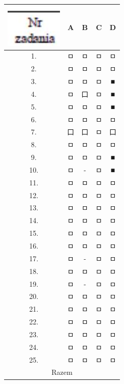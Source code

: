 \documentclass[10pt]{article}
\begin{document}
\begin{center}
\begin{tabular}{|c|c|c|c|c|}
\hline
\includegraphics[max width=\textwidth]{2024_11_21_92d5a9232f32cac9f1a4g-16}
 & A & B & C & D \\
\hline
1. & ㅁ & ㅁ & ㅁ & ㅁ \\
\hline
2. & ㅁ & ㅁ & ㅁ & ㅁ \\
\hline
3. & ㅁ & ㅁ & ㅁ & ■ \\
\hline
4. & ㅁ & 口 & ㅁ & ■ \\
\hline
5. & ㅁ & ㅁ & ㅁ & ■ \\
\hline
6. & ㅁ & ㅁ & ㅁ & ㅁ \\
\hline
7. & 口 & 口 & ㅁ & 口 \\
\hline
8. & ㅁ & ㅁ & ㅁ & ㅁ \\
\hline
9. & ㅁ & ㅁ & ㅁ & ■ \\
\hline
10. & ㅁ & - & ㅁ & ■ \\
\hline
11. & ㅁ & ㅁ & ㅁ & ㅁ \\
\hline
12. & ㅁ & ㅁ & ㅁ & ㅁ \\
\hline
13. & ㅁ & ㅁ & ㅁ & ㅁ \\
\hline
14. & ㅁ & ㅁ & ㅁ & ㅁ \\
\hline
15. & ㅁ & ㅁ & ㅁ & ㅁ \\
\hline
16. & ㅁ & ㅁ & ㅁ & ㅁ \\
\hline
17. & ㅁ & - & ㅁ & ㅁ \\
\hline
18. & ㅁ & ㅁ & ㅁ & ㅁ \\
\hline
19. & ㅁ & - & ㅁ & ㅁ \\
\hline
20. & ㅁ & ㅁ & ㅁ & ㅁ \\
\hline
21. & ㅁ & ㅁ & ㅁ & ㅁ \\
\hline
22. & ㅁ & ㅁ & ㅁ & ㅁ \\
\hline
23. & ㅁ & ㅁ & ㅁ & ㅁ \\
\hline
24. & ㅁ & ㅁ & ㅁ & ㅁ \\
\hline
25. & ㅁ & ㅁ & ㅁ & ㅁ \\
\hline
\multicolumn{5}{|c|}{Razem} \\
\hline
\end{tabular}
\end{center}
\end{document}
